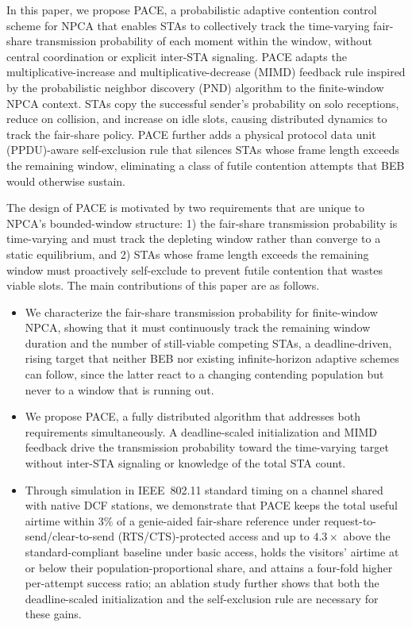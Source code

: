 \documentclass[conference]{IEEEtran}
\begin{document}
In this paper, we propose PACE, a probabilistic adaptive contention control scheme for NPCA that enables STAs to collectively track the time-varying fair-share transmission probability of each moment within the window, without central coordination or explicit inter-STA signaling. PACE adapts the multiplicative-increase and multiplicative-decrease (MIMD) feedback rule inspired by the probabilistic neighbor discovery (PND) algorithm \cite{song2014pnd} to the finite-window NPCA context. STAs copy the successful sender's probability on solo receptions, reduce on collision, and increase on idle slots, causing distributed dynamics to track the fair-share policy. PACE further adds a physical protocol data unit (PPDU)-aware self-exclusion rule that silences STAs whose frame length exceeds the remaining window, eliminating a class of futile contention attempts that BEB would otherwise sustain.

The design of PACE is motivated by two requirements that are unique to NPCA's bounded-window structure: 1) the fair-share transmission probability is time-varying and must track the depleting window rather than converge to a static equilibrium, and 2) STAs whose frame length exceeds the remaining window must proactively self-exclude to prevent futile contention that wastes viable slots. The main contributions of this paper are as follows.

\begin{itemize}
  \item We characterize the fair-share transmission probability for finite-window NPCA, showing that it must continuously track the remaining window duration and the number of still-viable competing STAs, a deadline-driven, rising target that neither BEB nor existing infinite-horizon adaptive schemes can follow, since the latter react to a changing contending population but never to a window that is running out.
  \item We propose PACE, a fully distributed algorithm that addresses both requirements simultaneously. A deadline-scaled initialization and MIMD feedback drive the transmission probability toward the time-varying target without inter-STA signaling or knowledge of the total STA count.
  \item Through simulation in IEEE~802.11 standard timing on a channel shared with native DCF stations, we demonstrate that PACE keeps the total useful airtime within $3\%$ of a genie-aided fair-share reference under request-to-send/clear-to-send (RTS/CTS)-protected access and up to $4.3\times$ above the standard-compliant baseline under basic access, holds the visitors' airtime at or below their population-proportional share, and attains a four-fold higher per-attempt success ratio; an ablation study further shows that both the deadline-scaled initialization and the self-exclusion rule are necessary for these gains.
\end{itemize}
\end{document}

